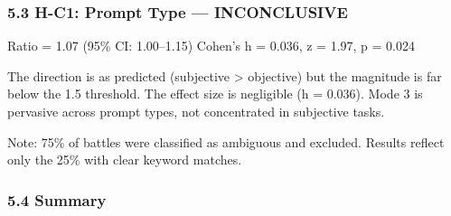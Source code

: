 \subsubsection{5.3 H-C1: Prompt Type --- INCONCLUSIVE}

\begin{table}[htbp]
\centering
{}
\end{table}

Ratio = 1.07 (95\% CI: 1.00--1.15)
Cohen's h = 0.036, z = 1.97, p = 0.024

The direction is as predicted (subjective > objective) but the magnitude is far below the 1.5 threshold. The effect size is negligible (h = 0.036). Mode 3 is pervasive across prompt types, not concentrated in subjective tasks.

Note: 75\% of battles were classified as ambiguous and excluded. Results reflect only the 25\% with clear keyword matches.

\subsubsection{5.4 Summary}

\begin{table}[htbp]
\centering
{}
\end{table}
